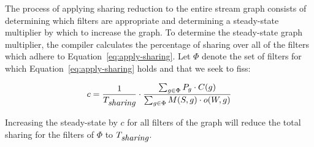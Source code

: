 The process of applying sharing reduction to the entire stream graph
consists of determining which filters are appropriate and determining
a steady-state multiplier by which to increase the graph.  To
determine the steady-state graph multiplier, the compiler calculates
the percentage of sharing over all of the filters which adhere to
Equation~\ref{eq:apply-sharing}.  Let $\Phi$ denote the set of filters
for which Equation~\ref{eq:apply-sharing} holds and that we seek to
fiss:

\begin{equation}
\label{eq:sr-mult}
c = \frac{1}{T_{\mbox{\it sharing}}} \cdot \frac{\sum_{g \in \Phi} P_g \cdot C(g) }{\sum _{g \in
    \Phi} M(S, g) \cdot o(W, g)}
\end{equation}

\noindent Increasing the steady-state by $c$ for all filters of the
graph will reduce the total sharing for the filters of $\Phi$ to
$T_{\mbox{\it sharing}}$.  